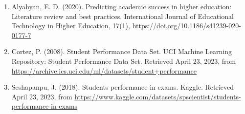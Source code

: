 \documentclass[
]{article}
\begin{document}
\begin{enumerate}
\def\labelenumi{\arabic{enumi}.}
\item
  Alyahyan, E. D. (2020). Predicting academic success in higher
  education: Literature review and best practices. International Journal
  of Educational Technology in Higher Education, 17(1),
  \url{https://doi.org/10.1186/s41239-020-0177-7}
\item
  Cortez, P. (2008). Student Performance Data Set. UCI Machine Learning
  Repository: Student Performance Data Set. Retrieved April 23, 2023,
  from \url{https://archive.ics.uci.edu/ml/datasets/student+performance}
\item
  Seshapanpu, J. (2018). Students performance in exams. Kaggle.
  Retrieved April 23, 2023, from
  \url{https://www.kaggle.com/datasets/spscientist/students-performance-in-exams}
\end{enumerate}
\end{document}
